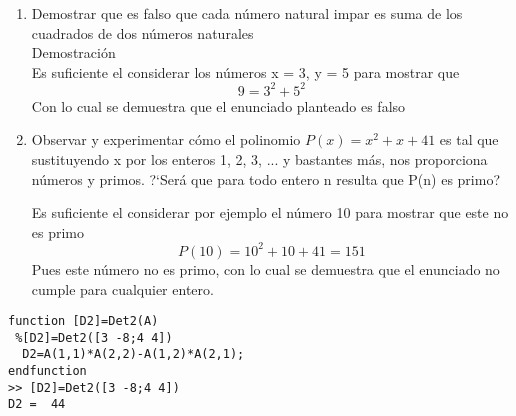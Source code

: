 \documentclass{article}
\begin{document}
\begin {enumerate}
\begin {enumerate}
Si P(h) es cierta, llamada hipótesis de inducción, se tiene que
\begin {equation}
\label {pregunta 31 ec 10}
\displaystyle \sum_{k=1}^{n} \; (2h - 1) = h^2 = 1 + 3 + 5 + ... +(2h - 1)
\end {equation}
A partir de aquí, queremos llegar a ver si P(h + 1) es cierta, es decir, queremos ver si se cumple que
\begin {equation}
\displaystyle \sum_{k=0}^{n} \; (2h+1) = (h +1)^2
\end {equation}
Consideremos el lado izquierdo de la igualdad, tendremos que 
$$\displaystyle \sum_{k=0}^{n} \; (2h+1) =1 + 3 + 5 + ... + (2h - 1) + (2h + 1) $$
Reemplazando la hipótesis de inducción (\ref {pregunta 31 ec 10}), se tiene
\begin{align*}
\displaystyle \sum_{k=0}^{n} \; (2h + 1) &= h^2+ (2h + 1) \\
\displaystyle \sum_{k=0}^{n} \; (2h+1) &= h^2 + 2h +1 \\
\displaystyle \sum_{k=0}^{n} \; (2h+1) &= (h + 1)^2
\end{align*}
Hemos demostrado entonces que P(h + 1) es verdadera. 
\\ 

Por lo tanto, si P(1) y P(h + 1) es verdadera, se verifica entonces la validez de la ecuación tendremos que 
\end {enumerate}
\item
Demostrar que es falso que cada número natural impar es suma de los cuadrados de dos números naturales
\\

Demostración
\\

Es suficiente el considerar los números x = 3, y = 5 para mostrar que 
$$9 = 3^2 + 5^2$$
Con lo cual se demuestra que el enunciado planteado es falso
\item
Observar y experimentar cómo el polinomio $P(x) =x^2 + x + 41$ es tal que sustituyendo x por los enteros 1, 2, 3, ... y bastantes más, nos proporciona números y primos. ?`Será que para todo entero n resulta que P(n) es primo?


Es suficiente el considerar por ejemplo el número 10 para mostrar que este no es primo
$$P(10) = 10^2 + 10 + 41 = 151$$
Pues este número no es primo, con lo cual se demuestra que el enunciado no cumple para cualquier entero.
\end{enumerate}
\begin{verbatim}
function [D2]=Det2(A)
 %[D2]=Det2([3 -8;4 4])
  D2=A(1,1)*A(2,2)-A(1,2)*A(2,1);
endfunction
>> [D2]=Det2([3 -8;4 4])
D2 =  44
\end{verbatim}
\end{document}
